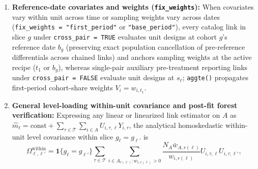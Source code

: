 \documentclass[11pt]{article}
\theoremstyle{definition}
\theoremstyle{remark}
\begin{document}
\begin{enumerate}
\begin{itemize}
\item \emph{Actual-change imputation (\texttt{"imputation"}, $U = F$):} Stage~1 fits cohort-pair actual-change WLS models $\hat{m}_{h,s,t}^{\mathrm{act}}(X)$ across active cells under \texttt{imputation\_pooling} (\texttt{"separate"}, \texttt{"within\_cohort"}, or \texttt{"across\_cohorts"}), reconstructing full-roster pseudo-changes $\tilde{Y}_{i,\ell} = \hat{m}_{h_\ell, s_\ell, t_\ell}^{\mathrm{act}}(X_i)$ for every $i \in F_{h_\ell}$. Target links average $\tilde{Y}_{i,\ell}$ on $F_g$; control links apply treatment IPW, OR, or DR on $F_g \sqcup F_k$ without pair-attrition distortion.
\item \emph{Augmented correction (\texttt{"dr"}, $U = F$):} Combines Stage-1 actual-change imputation $\hat{m}_{h,s,t}^{\mathrm{act}}(X_i)$ on $F_h$ with observation-weighted residual correction $S_{i,s,t}\hat{\pi}_{h,s,t}(X_i)\bigl(\Delta Y_{i,s,t} - \hat{m}_{h,s,t}^{\mathrm{act}}(X_i)\bigr)$ on both target links ($h = g$) and control links ($h = k$), propagating the coupled Stage-1 WLS, observation-logit, synthetic-propensity, and counterfactual-OR Jacobians simultaneously.
\end{itemize}
\item \textbf{Reference-date covariates and weights (\texttt{fix\_weights}):} When covariates vary within unit across time or sampling weights vary across dates (\texttt{fix\_weights = "first\_period"} or \texttt{"base\_period"}), every catalog link in slice $g$ under \texttt{cross\_pair = TRUE} evaluates unit designs at cohort $g$'s reference date $b_g$ (preserving exact population cancellation of pre-reference differentials across chained links) and anchors sampling weights at the active recipe ($t_1$ or $b_g$), whereas single-pair auxiliary pre-treatment reporting links under \texttt{cross\_pair = FALSE} evaluate unit designs at $s_\ell$; \texttt{aggte()} propagates first-period cohort-share weights $V_i = w_{i, t_1}$.
\item \textbf{General level-loading within-unit covariance and post-fit forest verification:} Expressing any linear or linearized link estimator on $A$ as $\hat{m}_\ell = \text{const} + \sum_{\tau \in \mathcal{T}} \sum_{i \in A} U_{i,\tau,\ell} Y_{i,\tau}$, the analytical homoskedastic within-unit level covariance within slice $g_\ell = g_{\ell'}$ is
\[
\Omega^{\mathrm{within}}_{\ell, \ell'} = \mathbf{1}\{g_\ell = g_{\ell'}\} \sum_{\tau \in \mathcal{T}} \sum_{i \in A_{r(\ell)} : w_{i,r(\ell)} > 0} \frac{N_A \bar{w}_{A,r(\ell)}}{w_{i,r(\ell)}} U_{i,\tau,\ell} U_{i,\tau,\ell'},
\]
\end{enumerate}
\end{document}
